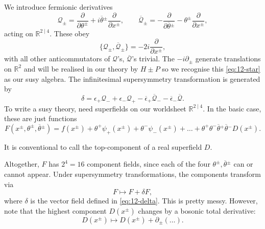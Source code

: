 We introduce fermionic derivatives
\begin{equation}
  \label{eq:12-Q}
  \mathcal{Q}_{\pm} = \frac{\partial }{\partial \theta^{\pm}} + i \overline{\theta}{}^{\pm} \frac{\partial }{\partial x^{\pm}}, \qquad \overline{\mathcal{Q}}{}_{\pm} = -\frac{\partial }{\partial \overline{\theta}{}^{\pm}} - \theta^{\pm} \frac{\partial }{\partial x^{\pm}},
\end{equation}
acting on $\mathbb{R}^{2 \mid 4}$.
These obey
\begin{equation}
  \label{eq:12-star}
  \{\mathcal{Q}_{\pm}, \overline{\mathcal{Q}}_{\pm}\} = -2 i \frac{\partial }{\partial x^{\pm}},
\end{equation}
with all other anticommutators of $\mathcal{Q}$'s, $\overline{\mathcal{Q}}{}$'s trivial.
The $-i \partial_{\pm}$ generate translations on $\mathbb{R}^2$ and will be realised in our theory by $H \pm P$ so we recognise this \eqref{eq:12-star} as our susy algebra.
The infinitesimal supersymmetry transformation is generated by
\begin{equation}
  \label{eq:12-delta}
  \delta = \epsilon_+ \mathcal{Q}_- + \epsilon_- \mathcal{Q}_+ - \overline{\epsilon}{}_+ \overline{\mathcal{Q}}{}_- - \overline{\epsilon}{}_- \overline{\mathcal{Q}}{}.
\end{equation}
To write a susy theory, need superfields on our worldsheet $\mathbb{R}^{2 \mid 4}$. In the basic case, these are just functions 
\begin{equation}
  F(x^{\pm}, \theta^{\pm}, \overline{\theta}{}^{\pm}) = f(x^{\pm}) + \theta^+ \psi_+ (x^{\pm}) + \theta^- \psi_- (x^{\pm}) + \dots + \theta^+ \theta^- \overline{\theta}{}^{+} \overline{\theta}{}^{-} D(x^{\pm}).
\end{equation}
\begin{leftbar}
  It is conventional to call the top-component of a real superfield $D$.
\end{leftbar}
Altogether, $F$ has $2^4 = 16$ component fields, since each of the four $\theta^{\pm}, \overline{\theta}{}^{\pm}$ can or cannot appear.
Under supersymmetry transformations, the components transform via
\begin{equation}
  F \mapsto F + \delta F,
\end{equation}
where $\delta$ is the vector field defined in \eqref{eq:12-delta}.
This is pretty messy. However, note that the highest component $D(x^{\pm})$ changes by a bosonic total derivative:
\begin{equation}
  D(x^{\pm}) \mapsto D(x^{\pm}) + \partial_{\pm} ( \dots).
\end{equation}
